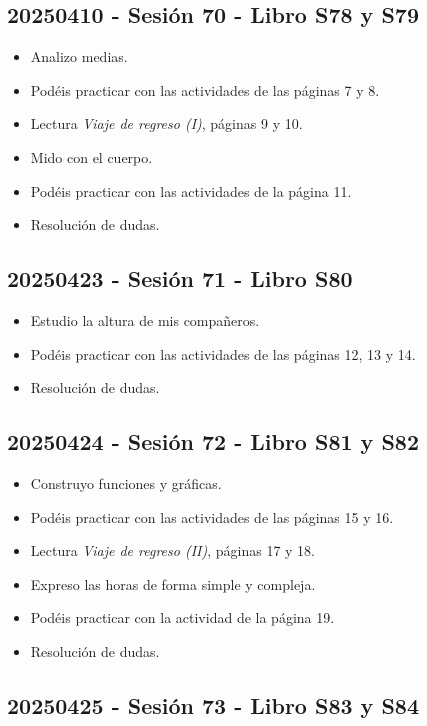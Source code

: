 \documentclass[a4paper,12pt]{article}
\begin{document}
\subsection{20250410 - Sesión 70 - Libro S78 y S79}

\begin{itemize}
    \item Analizo medias.
    \item Podéis practicar con las actividades de las páginas 7 y 8.
    \item Lectura \textit{Viaje de regreso (I)}, páginas 9 y 10.
    \item Mido con el cuerpo.
    \item Podéis practicar con las actividades de la página 11.
    \item Resolución de dudas.
\end{itemize}

\subsection{20250423 - Sesión 71 - Libro S80}

\begin{itemize}
    \item Estudio la altura de mis compañeros.
    \item Podéis practicar con las actividades de las páginas 12, 13 y 14.
    \item Resolución de dudas.
\end{itemize}

\subsection{20250424 - Sesión 72 - Libro S81 y S82}

\begin{itemize}
    \item Construyo funciones y gráficas.
    \item Podéis practicar con las actividades de las páginas 15 y 16.
    \item Lectura \textit{Viaje de regreso (II)}, páginas 17 y 18.
    \item Expreso las horas de forma simple y compleja.
    \item Podéis practicar con la actividad de la página 19.
    \item Resolución de dudas.
\end{itemize}

\subsection{20250425 - Sesión 73 - Libro S83 y S84}
\end{document}

